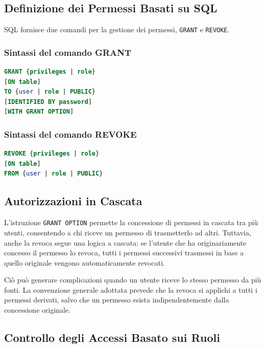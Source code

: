 \subsection{Definizione dei Permessi Basati su SQL}

SQL fornisce due comandi per la gestione dei permessi, \texttt{GRANT} e \texttt{REVOKE}.

\subsubsection{Sintassi del comando GRANT}

\begin{lstlisting}[language=SQL]
GRANT {privileges | role} 
[ON table]
TO {user | role | PUBLIC}
[IDENTIFIED BY password]
[WITH GRANT OPTION]
\end{lstlisting}

\subsubsection{Sintassi del comando REVOKE}

\begin{lstlisting}[language=SQL]
REVOKE {privileges | role} 
[ON table]
FROM {user | role | PUBLIC}
\end{lstlisting}

\subsection{Autorizzazioni in Cascata}

L'istruzione \texttt{GRANT OPTION} permette la concessione di permessi in cascata tra più utenti, consentendo a chi riceve un permesso di trasmetterlo ad altri. Tuttavia, anche la revoca segue una logica a cascata: se l'utente che ha originariamente concesso il permesso lo revoca, tutti i permessi successivi trasmessi in base a quello originale vengono automaticamente revocati.

Ciò può generare complicazioni quando un utente riceve lo stesso permesso da più fonti. La convenzione generale adottata prevede che la revoca si applichi a tutti i permessi derivati, salvo che un permesso esista indipendentemente dalla concessione originale.

\subsection{Controllo degli Accessi Basato sui Ruoli}

